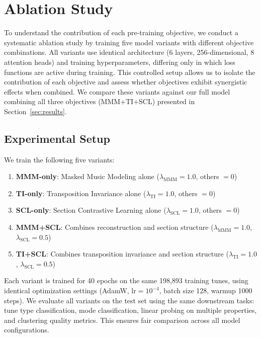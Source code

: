 \documentclass[]{interact}
\theoremstyle{plain}
\theoremstyle{definition}
\theoremstyle{remark}
\begin{document}
\section{Ablation Study}\label{sec:ablation}

To understand the contribution of each pre-training objective, we conduct a systematic ablation study by training five model variants with different objective combinations. All variants use identical architecture (6 layers, 256-dimensional, 8 attention heads) and training hyperparameters, differing only in which loss functions are active during training. This controlled setup allows us to isolate the contribution of each objective and assess whether objectives exhibit synergistic effects when combined. We compare these variants against our full model combining all three objectives (MMM+TI+SCL) presented in Section~\ref{sec:results}.

\subsection{Experimental Setup}

We train the following five variants:

\begin{enumerate}
    \item \textbf{MMM-only}: Masked Music Modeling alone ($\lambda_{\text{MMM}}=1.0$, others $=0$)
    \item \textbf{TI-only}: Transposition Invariance alone ($\lambda_{\text{TI}}=1.0$, others $=0$)
    \item \textbf{SCL-only}: Section Contrastive Learning alone ($\lambda_{\text{SCL}}=1.0$, others $=0$)
    \item \textbf{MMM+SCL}: Combines reconstruction and section structure ($\lambda_{\text{MMM}}=1.0$, $\lambda_{\text{SCL}}=0.5$)
    \item \textbf{TI+SCL}: Combines transposition invariance and section structure ($\lambda_{\text{TI}}=1.0$, $\lambda_{\text{SCL}}=0.5$)
\end{enumerate}

Each variant is trained for 40 epochs on the same 198,893 training tunes, using identical optimization settings (AdamW, $\text{lr}=10^{-4}$, batch size 128, warmup 1000 steps). We evaluate all variants on the test set using the same downstream tasks: tune type classification, mode classification, linear probing on multiple properties, and clustering quality metrics. This ensures fair comparison across all model configurations.
\end{document}
